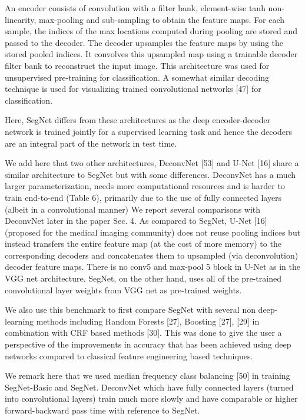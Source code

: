 An encoder consists of
convolution with a filter bank, element-wise tanh non-linearity,
max-pooling and sub-sampling to obtain the feature maps. For
each sample, the indices of the max locations computed during
pooling are stored and passed to the decoder. The decoder upsamples the feature maps by using the stored pooled indices. It
convolves this upsampled map using a trainable decoder filter
bank to reconstruct the input image. This architecture was used for
unsupervised pre-training for classification. A somewhat similar
decoding technique is used for visualizing trained convolutional
networks [47] for classification.

Here, SegNet differs from
these architectures as the deep encoder-decoder network is trained
jointly for a supervised learning task and hence the decoders are
an integral part of the network in test time.

We add here that two other architectures, DeconvNet [53] and
U-Net [16] share a similar architecture to SegNet but with some
differences. DeconvNet has a much larger parameterization, needs
more computational resources and is harder to train end-to-end
(Table 6), primarily due to the use of fully connected layers (albeit
in a convolutional manner) We report several comparisons with
DeconvNet later in the paper Sec. 4.
As compared to SegNet, U-Net [16] (proposed for the medical
imaging community) does not reuse pooling indices but instead
transfers the entire feature map (at the cost of more memory) to
the corresponding decoders and concatenates them to upsampled
(via deconvolution) decoder feature maps. There is no conv5 and
max-pool 5 block in U-Net as in the VGG net architecture. SegNet,
on the other hand, uses all of the pre-trained convolutional layer
weights from VGG net as pre-trained weights.

We also use this benchmark to first compare SegNet with several non deep-learning methods including Random Forests [27],
Boosting [27], [29] in combination with CRF based methods [30].
This was done to give the user a perspective of the improvements
in accuracy that has been achieved using deep networks compared
to classical feature engineering based techniques.

We remark here
that we used median frequency class balancing [50] in training
SegNet-Basic and SegNet. DeconvNet which have fully connected layers (turned into convolutional layers) train much more slowly and have comparable
or higher forward-backward pass time with reference to SegNet.

